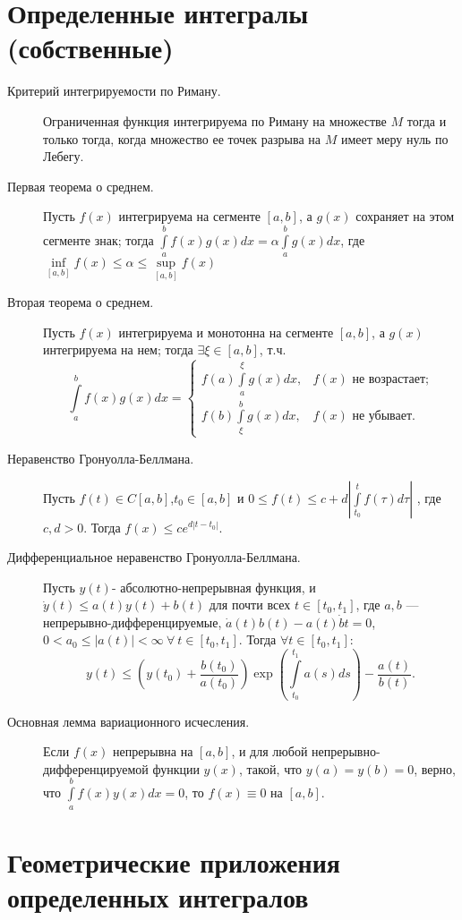 \documentclass[a4paper,12pt]{scrartcl}
\begin{document}
\section{Определенные интегралы (собственные)}
\begin{description}
\item[Критерий интегрируемости по Риману.] Ограниченная функция интегрируема по Риману на множестве $M$ тогда и только тогда, когда множество ее точек разрыва на $M$ имеет меру нуль по Лебегу.
\item[Первая теорема о среднем.] Пусть $f(x)$ интегрируема на сегменте $[a,b]$, а $g(x)$ сохраняет на этом сегменте знак; тогда $\int\limits_{a}^{b}f(x)g(x)dx = \alpha\int\limits_{a}^{b}g(x)dx$, где $\inf\limits_{[a,b]}f(x) \leqslant \alpha \leqslant \sup\limits_{[a,b]}f(x)$
\item[Вторая теорема о среднем.] Пусть $f(x)$ интегрируема и монотонна на сегменте $[a,b]$, а $g(x)$ интегрируема на нем; тогда $\exists \xi \in [a,b]$, т.ч. $$\int\limits_{a}^{b}f(x)g(x)dx =
\begin{cases} f(a)\int\limits_{a}^{\xi}g(x)dx, &{f(x)\text{ не возрастает;}} \\ f(b)\int\limits_{\xi}^{b}g(x)dx, &{f(x)\text{ не убывает.}}
\end{cases}  $$
\item[Неравенство Гронуолла-Беллмана.] Пусть $f(t)\in C[a,b]$,$t_0 \in [a,b]$ и $0 \leqslant f(t) \leqslant c + d\left|\int\limits_{t_0}^{t}f(\tau)d\tau\right|$ , где $c,d > 0$. Тогда $f(x) \leqslant ce^{d|t-t_0|}$.
\item[Дифференциальное неравенство Гронуолла-Беллмана.] Пусть $y(t)$- абсолютно-непрерывная функция, и $\dot{y}(t) \leqslant a(t)y(t)+b(t)$ для почти всех $t\in[t_0,t_1]$, где $a,b$ --- непрерывно-дифференцируемые, $\dot{a}(t)b(t) - a(t)\dot{b}{t}=0$, $0 <a_0 \leqslant |a(t)| < \infty\ \forall\ t\in[t_0,t_1]$. Тогда $\forall t\in[t_0,t_1]$:
$$
y(t) \leqslant \left(y(t_0) + \dfrac{b(t_0)}{a(t_0)}\right)\exp\left(\int\limits_{t_0}^{t_1}a(s)ds \right) - \dfrac{a(t)}{b(t)}.
$$
\item[Основная лемма вариационного исчесления.] Если $f(x)$ непрерывна на $[a,b]$, и для любой непрерывно-дифференцируемой функции $y(x)$, такой, что $y(a)=y(b)=0$, верно, что $\int\limits_a^bf(x)y(x)dx = 0$, то $f(x)\equiv 0$ на $[a,b]$.
\end{description} 
\section{Геометрические приложения определенных интегралов}
\end{document}
